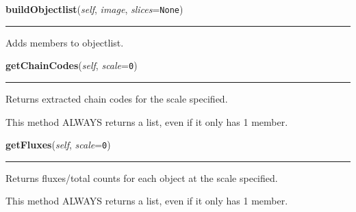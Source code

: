     \label{multireg:objectlist:ObjectList:buildObjectlist}
    \vspace{0.5ex}

    \begin{boxedminipage}{\textwidth}

    \raggedright \textbf{buildObjectlist}(\textit{self}, \textit{image}, \textit{slices}=\texttt{N\-o\-n\-e\-})

    \vspace{-1.5ex}

    \rule{\textwidth}{0.5\fboxrule}
    Adds members to objectlist.

    \vspace{1ex}

    \end{boxedminipage}

    \label{multireg:objectlist:ObjectList:getChainCodes}
    \vspace{0.5ex}

    \begin{boxedminipage}{\textwidth}

    \raggedright \textbf{getChainCodes}(\textit{self}, \textit{scale}=\texttt{0\-})

    \vspace{-1.5ex}

    \rule{\textwidth}{0.5\fboxrule}
    Returns extracted chain codes for the scale specified.

    This method ALWAYS returns a list, even if it only has 1 member.

    \vspace{1ex}

    \end{boxedminipage}

    \label{multireg:objectlist:ObjectList:getFluxes}
    \vspace{0.5ex}

    \begin{boxedminipage}{\textwidth}

    \raggedright \textbf{getFluxes}(\textit{self}, \textit{scale}=\texttt{0\-})

    \vspace{-1.5ex}

    \rule{\textwidth}{0.5\fboxrule}
    Returns fluxes/total counts for each object at the scale specified.

    This method ALWAYS returns a list, even if it only has 1 member.

    \vspace{1ex}

    \end{boxedminipage}

